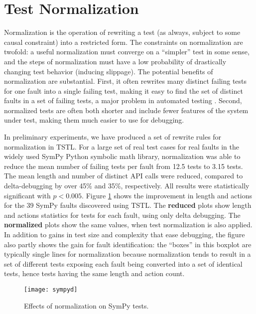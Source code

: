 \section{Test Normalization}

Normalization is the operation of rewriting a test (as always, subject
to some causal constraint) into a restricted form.  The constraints on
normalization are twofold:  a useful normalization must converge on a
``simpler'' test in some sense, and the steps of normalization must
have a low probability of drastically changing test behavior (inducing
slippage).  The potential benefits of normalization are substantial.  First, it
often rewrites many distinct failing tests for one fault into a single
failing test, making it easy to find the set of distinct faults in a
set of failing tests, a major problem in automated testing
\cite{PLDI13}.   Second, normalized tests are often both shorter and
include fewer features of the system under test, making them much
easier to use for debugging.

In preliminary experiments, we have produced a set of
rewrite rules for normalization in TSTL.  For a large set of real test
cases for real faults in the widely used SymPy Python symbolic math
library, normalization was able to reduce the mean number of failing
tests per fault from 12.5 tests to 3.15 tests.  The mean length and number of
distinct API calls were reduced, compared to delta-debugging by over
45\% and 35\%, respectively.  All results were statistically
significant with $p < 0.005$.  Figure \ref{lengthandactions} shows the
improvement in length and actions for the 39 SymPy faults discovered
using TSTL.  The {\bf reduced} plots show length and actions
statistics for tests for each fault, using only delta debugging.  The
{\bf normalized} plots show the same values, when test normalization
is also applied.  In addition to gains in test size and complexity
that ease debugging, the figure also partly shows the gain for fault
identification:  the ``boxes'' in this boxplot are typically single
lines for normalization because normalization tends to result in a set
of different tests exposing each fault being converted into a set of
identical tests, hence tests having the same length and action count.

\begin{figure}[t]
\texttt{[image: sympyd]}
\caption{Effects of normalization on SymPy tests.}
\label{lengthandactions}
\end{figure}

